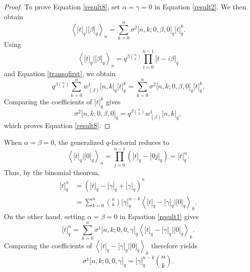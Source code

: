 \documentclass[12pt]{article}
\begin{document}
\begin{proof}
	To prove Equation \eqref{result8}, set $\alpha=\gamma=0$ in Equation
	\eqref{result2}. We then obtain
	\begin{equation*}
		\left\langle \big[t\big]_q|\big[\beta\big]_q\right\rangle_n
		=
		\sum_{k=0}^{n}
		\sigma^2\big[n,k;0,\beta,0\big]_q
		\big[t\big]_q^k.
	\end{equation*}
	Using
	\begin{equation*}
		\left\langle \big[t\big]_q|\big[\beta\big]_q\right\rangle_n
		=
		q^{\beta\binom{n}{2}}
		\prod_{i=0}^{n-1}\big[t-i\beta\big]_q
	\end{equation*}
	and Equation \eqref{transqfirst}, we obtain
	\begin{equation*}
		q^{\beta\binom{n}{2}}
		\sum_{k=0}^{n}
		w^1_{(\beta)}\big[n,k\big]_q
		\big[t\big]_q^k
		=
		\sum_{k=0}^{n}
		\sigma^2\big[n,k;0,\beta,0\big]_q
		\big[t\big]_q^k.
	\end{equation*}
	Comparing the coefficients of $\big[t\big]_q^k$ gives
	\begin{equation*}
		\sigma^2\big[n,k;0,\beta,0\big]_q
		=
		q^{\beta\binom{n}{2}}
		w^1_{(\beta)}\big[n,k\big]_q,
	\end{equation*}
	which proves Equation \eqref{result8}.
\end{proof}

When $\alpha=\beta=0$, the generalized $q$-factorial reduces to
\[
\left\langle \big[t\big]_q|\big[0\big]_q\right\rangle_n
=
\prod_{j=0}^{n-1}
\left(\big[t\big]_q-\big[0j\big]_q\right)
=
\big[t\big]_q^n.
\]
Thus, by the binomial theorem,
\begin{align*}
	\big[t\big]_q^n
	&=
	\left(
	\big[t\big]_q-\big[\gamma\big]_q+\big[\gamma\big]_q
	\right)^n\\
	&=
	\sum_{k=0}^{n}
	\binom{n}{k}
	\big[\gamma\big]_q^{n-k}
	\left\langle
	\big[t\big]_q-\big[\gamma\big]_q
	\big|
	\big[0\big]_q
	\right\rangle_k.
\end{align*}
On the other hand, setting $\alpha=\beta=0$ in Equation \eqref{result1} gives
\begin{equation*}
	\big[t\big]_q^n
	=
	\sum_{k=0}^{n}
	\sigma^1\big[n,k;0,0,\gamma\big]_q
	\left\langle
	\big[t\big]_q-\big[\gamma\big]_q
	\big|
	\big[0\big]_q
	\right\rangle_k.
\end{equation*}
Comparing the coefficients of
$\left\langle
\big[t\big]_q-\big[\gamma\big]_q
\big|
\big[0\big]_q
\right\rangle_k$
therefore yields
\begin{equation*}
	\sigma^1\big[n,k;0,0,\gamma\big]_q
	=
	\big[\gamma\big]_q^{n-k}\binom{n}{k}.
\end{equation*}
\end{document}
